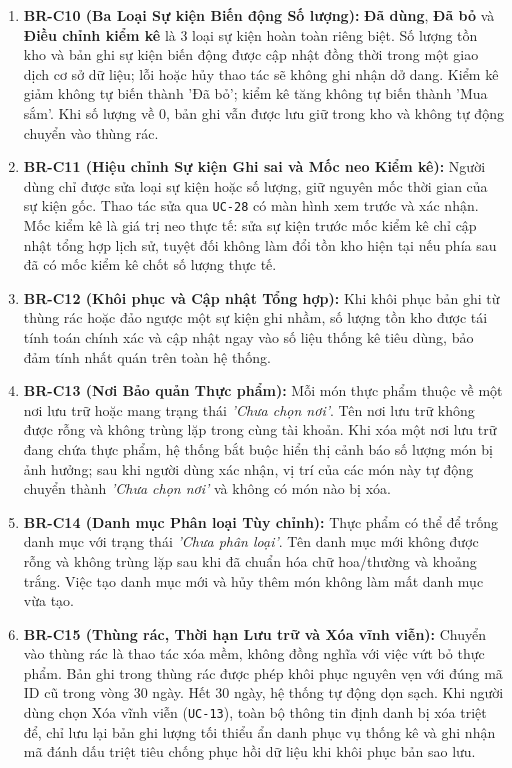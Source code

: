 \documentclass[10pt,a4paper]{article}
\begin{document}
\begin{enumerate}[leftmargin=2em,itemsep=6pt]
    \item \textbf{BR-C10 (Ba Loại Sự kiện Biến động Số lượng):} \textbf{Đã dùng}, \textbf{Đã bỏ} và \textbf{Điều chỉnh kiểm kê} là 3 loại sự kiện hoàn toàn riêng biệt. Số lượng tồn kho và bản ghi sự kiện biến động được cập nhật đồng thời trong một giao dịch cơ sở dữ liệu; lỗi hoặc hủy thao tác sẽ không ghi nhận dở dang. Kiểm kê giảm không tự biến thành 'Đã bỏ'; kiểm kê tăng không tự biến thành 'Mua sắm'. Khi số lượng về 0, bản ghi vẫn được lưu giữ trong kho và không tự động chuyển vào thùng rác.
    \item \textbf{BR-C11 (Hiệu chỉnh Sự kiện Ghi sai và Mốc neo Kiểm kê):} Người dùng chỉ được sửa loại sự kiện hoặc số lượng, giữ nguyên mốc thời gian của sự kiện gốc. Thao tác sửa qua \texttt{UC-28} có màn hình xem trước và xác nhận. Mốc kiểm kê là giá trị neo thực tế: sửa sự kiện trước mốc kiểm kê chỉ cập nhật tổng hợp lịch sử, tuyệt đối không làm đổi tồn kho hiện tại nếu phía sau đã có mốc kiểm kê chốt số lượng thực tế.
    \item \textbf{BR-C12 (Khôi phục và Cập nhật Tổng hợp):} Khi khôi phục bản ghi từ thùng rác hoặc đảo ngược một sự kiện ghi nhầm, số lượng tồn kho được tái tính toán chính xác và cập nhật ngay vào số liệu thống kê tiêu dùng, bảo đảm tính nhất quán trên toàn hệ thống.
    \item \textbf{BR-C13 (Nơi Bảo quản Thực phẩm):} Mỗi món thực phẩm thuộc về một nơi lưu trữ hoặc mang trạng thái \textit{'Chưa chọn nơi'}. Tên nơi lưu trữ không được rỗng và không trùng lặp trong cùng tài khoản. Khi xóa một nơi lưu trữ đang chứa thực phẩm, hệ thống bắt buộc hiển thị cảnh báo số lượng món bị ảnh hưởng; sau khi người dùng xác nhận, vị trí của các món này tự động chuyển thành \textit{'Chưa chọn nơi'} và không có món nào bị xóa.
    \item \textbf{BR-C14 (Danh mục Phân loại Tùy chỉnh):} Thực phẩm có thể để trống danh mục với trạng thái \textit{'Chưa phân loại'}. Tên danh mục mới không được rỗng và không trùng lặp sau khi đã chuẩn hóa chữ hoa/thường và khoảng trắng. Việc tạo danh mục mới và hủy thêm món không làm mất danh mục vừa tạo.
    \item \textbf{BR-C15 (Thùng rác, Thời hạn Lưu trữ và Xóa vĩnh viễn):} Chuyển vào thùng rác là thao tác xóa mềm, không đồng nghĩa với việc vứt bỏ thực phẩm. Bản ghi trong thùng rác được phép khôi phục nguyên vẹn với đúng mã ID cũ trong vòng 30 ngày. Hết 30 ngày, hệ thống tự động dọn sạch. Khi người dùng chọn Xóa vĩnh viễn (\texttt{UC-13}), toàn bộ thông tin định danh bị xóa triệt để, chỉ lưu lại bản ghi lượng tối thiểu ẩn danh phục vụ thống kê và ghi nhận mã đánh dấu triệt tiêu chống phục hồi dữ liệu khi khôi phục bản sao lưu.

\end{enumerate}
\end{document}
